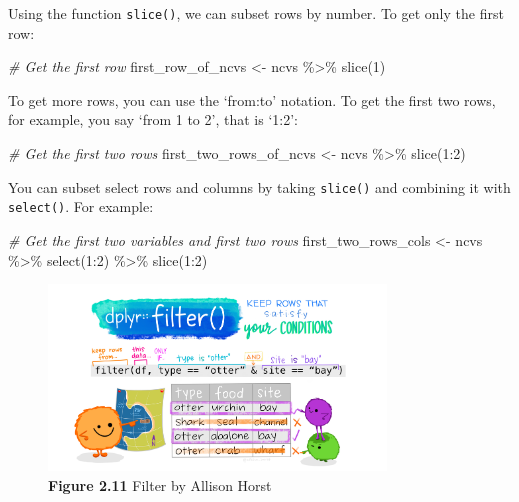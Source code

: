 \documentclass[
]{book}
\newenvironment{Shaded}{\begin{snugshade}}{\end{snugshade}}
\newcommand{\CommentTok}[1]{\textcolor[rgb]{0.56,0.35,0.01}{\textit{#1}}}
\newcommand{\DecValTok}[1]{\textcolor[rgb]{0.00,0.00,0.81}{#1}}
\newcommand{\FunctionTok}[1]{\textcolor[rgb]{0.00,0.00,0.00}{#1}}
\newcommand{\NormalTok}[1]{#1}
\newcommand{\OtherTok}[1]{\textcolor[rgb]{0.56,0.35,0.01}{#1}}
\newcommand{\SpecialCharTok}[1]{\textcolor[rgb]{0.00,0.00,0.00}{#1}}
\begin{document}
Using the function \texttt{slice()}, we can subset rows by number. To get only the first row:

\begin{Shaded}
\begin{Highlighting}[]
\CommentTok{\# Get the first row}
\NormalTok{first\_row\_of\_ncvs }\OtherTok{\textless{}{-}}\NormalTok{ ncvs }\SpecialCharTok{\%\textgreater{}\%} \FunctionTok{slice}\NormalTok{(}\DecValTok{1}\NormalTok{) }
\end{Highlighting}
\end{Shaded}

To get more rows, you can use the `from:to' notation. To get the first two rows, for example, you say `from 1 to 2', that is `1:2':

\begin{Shaded}
\begin{Highlighting}[]
\CommentTok{\# Get the first two rows }
\NormalTok{first\_two\_rows\_of\_ncvs }\OtherTok{\textless{}{-}}\NormalTok{ ncvs }\SpecialCharTok{\%\textgreater{}\%} \FunctionTok{slice}\NormalTok{(}\DecValTok{1}\SpecialCharTok{:}\DecValTok{2}\NormalTok{) }
\end{Highlighting}
\end{Shaded}

You can subset select rows and columns by taking \texttt{slice()} and combining it with \texttt{select()}. For example:

\begin{Shaded}
\begin{Highlighting}[]
\CommentTok{\# Get the first two variables and first two rows }
\NormalTok{first\_two\_rows\_cols }\OtherTok{\textless{}{-}}\NormalTok{ ncvs }\SpecialCharTok{\%\textgreater{}\%} \FunctionTok{select}\NormalTok{(}\DecValTok{1}\SpecialCharTok{:}\DecValTok{2}\NormalTok{) }\SpecialCharTok{\%\textgreater{}\%} \FunctionTok{slice}\NormalTok{(}\DecValTok{1}\SpecialCharTok{:}\DecValTok{2}\NormalTok{)}
\end{Highlighting}
\end{Shaded}

\begin{figure}
\centering
\includegraphics[width=0.8\textwidth,height=\textheight]{Images/dplyr_filter.jpg}
\caption{\textbf{Figure 2.11} Filter by Allison Horst}
\end{figure}
\end{document}
